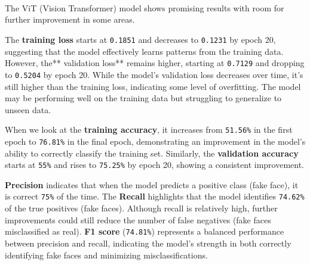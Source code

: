 \documentclass[12pt]{article}
\begin{document}
    \begin{center}
    \end{center}
    { \hspace*{\fill} \\}
    
    \begin{center}
    \end{center}
    { \hspace*{\fill} \\}
    
    \begin{center}
    \end{center}
    { \hspace*{\fill} \\}
    
    The ViT (Vision Transformer) model shows promising results with room for
further improvement in some areas.

The \textbf{training loss} starts at \texttt{0.1851} and decreases to
\texttt{0.1231} by epoch 20, suggesting that the model effectively
learns patterns from the training data. However, the** validation loss**
remains higher, starting at \texttt{0.7129} and dropping to
\texttt{0.5204} by epoch 20. While the model's validation loss decreases
over time, it's still higher than the training loss, indicating some
level of overfitting. The model may be performing well on the training
data but struggling to generalize to unseen data.

When we look at the \textbf{training accuracy}, it increases from
\texttt{51.56\%} in the first epoch to \texttt{76.81\%} in the final
epoch, demonstrating an improvement in the model's ability to correctly
classify the training set. Similarly, the \textbf{validation accuracy}
starts at \texttt{55\%} and rises to \texttt{75.25\%} by epoch 20,
showing a consistent improvement.

\textbf{Precision} indicates that when the model predicts a positive
class (fake face), it is correct \texttt{75\%} of the time. The
\textbf{Recall} highlights that the model identifies \texttt{74.62\%} of
the true positives (fake faces). Although recall is relatively high,
further improvements could still reduce the number of false negatives
(fake faces misclassified as real). \textbf{F1 score} (\texttt{74.81\%})
represents a balanced performance between precision and recall,
indicating the model's strength in both correctly identifying fake faces
and minimizing misclassifications.
\end{document}
